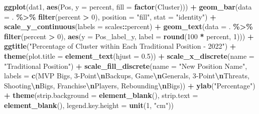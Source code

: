 \documentclass[
]{article}
\newenvironment{Shaded}{\begin{snugshade}}{\end{snugshade}}
\newcommand{\AttributeTok}[1]{\textcolor[rgb]{0.13,0.29,0.53}{#1}}
\newcommand{\DecValTok}[1]{\textcolor[rgb]{0.00,0.00,0.81}{#1}}
\newcommand{\FloatTok}[1]{\textcolor[rgb]{0.00,0.00,0.81}{#1}}
\newcommand{\FunctionTok}[1]{\textcolor[rgb]{0.13,0.29,0.53}{\textbf{#1}}}
\newcommand{\NormalTok}[1]{#1}
\newcommand{\SpecialCharTok}[1]{\textcolor[rgb]{0.81,0.36,0.00}{\textbf{#1}}}
\newcommand{\StringTok}[1]{\textcolor[rgb]{0.31,0.60,0.02}{#1}}
\begin{document}
\begin{Shaded}
\begin{Highlighting}[]
\FunctionTok{ggplot}\NormalTok{(dat1, }\FunctionTok{aes}\NormalTok{(Pos, }\AttributeTok{y =}\NormalTok{ percent, }\AttributeTok{fill =} \FunctionTok{factor}\NormalTok{(Cluster))) }\SpecialCharTok{+}
  \FunctionTok{geom\_bar}\NormalTok{(}\AttributeTok{data =}\NormalTok{ . }\SpecialCharTok{\%\textgreater{}\%} \FunctionTok{filter}\NormalTok{(percent }\SpecialCharTok{\textgreater{}} \DecValTok{0}\NormalTok{), }\AttributeTok{position =} \StringTok{"fill"}\NormalTok{, }\AttributeTok{stat =} \StringTok{"identity"}\NormalTok{) }\SpecialCharTok{+}
  \FunctionTok{scale\_y\_continuous}\NormalTok{(}\AttributeTok{labels =}\NormalTok{ scales}\SpecialCharTok{::}\NormalTok{percent) }\SpecialCharTok{+}
  \FunctionTok{geom\_text}\NormalTok{(}\AttributeTok{data =}\NormalTok{ . }\SpecialCharTok{\%\textgreater{}\%} \FunctionTok{filter}\NormalTok{(percent }\SpecialCharTok{\textgreater{}} \DecValTok{0}\NormalTok{), }\FunctionTok{aes}\NormalTok{(}\AttributeTok{y =}\NormalTok{ Pos\_label\_y, }\AttributeTok{label =} \FunctionTok{round}\NormalTok{(}\DecValTok{100} \SpecialCharTok{*}\NormalTok{ percent, }\DecValTok{1}\NormalTok{))) }\SpecialCharTok{+}
  \FunctionTok{ggtitle}\NormalTok{(}\StringTok{"Percentage of Cluster within Each Traditional Position {-} 2022"}\NormalTok{) }\SpecialCharTok{+}
  \FunctionTok{theme}\NormalTok{(}\AttributeTok{plot.title =} \FunctionTok{element\_text}\NormalTok{(}\AttributeTok{hjust =} \FloatTok{0.5}\NormalTok{)) }\SpecialCharTok{+}
  \FunctionTok{scale\_x\_discrete}\NormalTok{(}\AttributeTok{name =} \StringTok{"Traditional Position"}\NormalTok{) }\SpecialCharTok{+}
  \FunctionTok{scale\_fill\_discrete}\NormalTok{(}\AttributeTok{name =} \StringTok{"New Position Name"}\NormalTok{, }\AttributeTok{labels =} \FunctionTok{c}\NormalTok{(}\StringTok{\textquotesingle{}MVP Bigs\textquotesingle{}}\NormalTok{, }\StringTok{\textquotesingle{}3{-}Point}\SpecialCharTok{\textbackslash{}n}\StringTok{Backups\textquotesingle{}}\NormalTok{, }\StringTok{\textquotesingle{}Game}\SpecialCharTok{\textbackslash{}n}\StringTok{Generals\textquotesingle{}}\NormalTok{, }\StringTok{\textquotesingle{}3{-}Point}\SpecialCharTok{\textbackslash{}n}\StringTok{Threats\textquotesingle{}}\NormalTok{, }\StringTok{\textquotesingle{}Shooting}\SpecialCharTok{\textbackslash{}n}\StringTok{Bigs\textquotesingle{}}\NormalTok{, }\StringTok{\textquotesingle{}Franchise}\SpecialCharTok{\textbackslash{}n}\StringTok{Players\textquotesingle{}}\NormalTok{, }\StringTok{\textquotesingle{}Rebounding}\SpecialCharTok{\textbackslash{}n}\StringTok{Bigs\textquotesingle{}}\NormalTok{)) }\SpecialCharTok{+}
  \FunctionTok{ylab}\NormalTok{(}\StringTok{"Percentage"}\NormalTok{) }\SpecialCharTok{+}
  \FunctionTok{theme}\NormalTok{(}\AttributeTok{strip.background =} \FunctionTok{element\_blank}\NormalTok{(),}
        \AttributeTok{strip.text =} \FunctionTok{element\_blank}\NormalTok{(),}
        \AttributeTok{legend.key.height =} \FunctionTok{unit}\NormalTok{(}\DecValTok{1}\NormalTok{, }\StringTok{"cm"}\NormalTok{))}
\end{Highlighting}
\end{Shaded}
\end{document}

